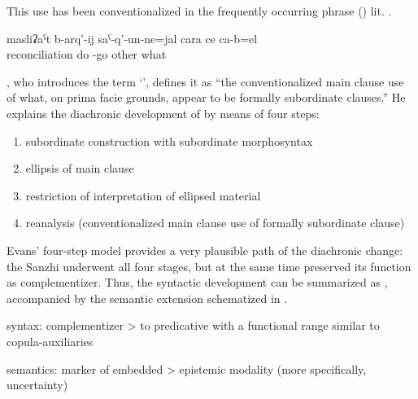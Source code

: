 This use has been conventionalized in the frequently occurring phrase  ()  lit.  .
%
\begin{exe}
	\ex	\label{ex:He came out to reconcile them or so or there is something else}
	\gll	masliʡaˁt	b-arq'-ij	saˁ-q'-un-ne=jal	cara	ce	ca-b=el\\
		reconciliation	do	-go	other	what	\\
	\glt	{}
\end{exe}

\citep[367]{Evans2007}, who introduces the term `', defines it as ``the conventionalized main clause use of what, on prima facie grounds, appear to be formally subordinate clauses.'' He explains the diachronic development of  by means of four steps:
\begin{enumerate}
\item subordinate construction with subordinate morphosyntax
\item ellipsis of main clause
\item restriction of interpretation of ellipsed material
\item reanalysis (conventionalized main clause use of formally subordinate clause)
\end{enumerate}
Evans' four-step model provides a very plausible path of the diachronic change: the Sanzhi  underwent all four stages, but at the same time preserved its function as complementizer. Thus, the syntactic development can be summarized as , accompanied by the semantic extension schematized in .

\begin{exe}
	\ex	 \label{ex:complementizer}
		syntax: complementizer > to predicative  with a functional range similar to copula-auxiliaries 
\end{exe}

\begin{exe}
	\ex	 \label{ex:complementizer2}
	semantics: marker of embedded  > epistemic modality (more specifically, uncertainty)
\end{exe}

